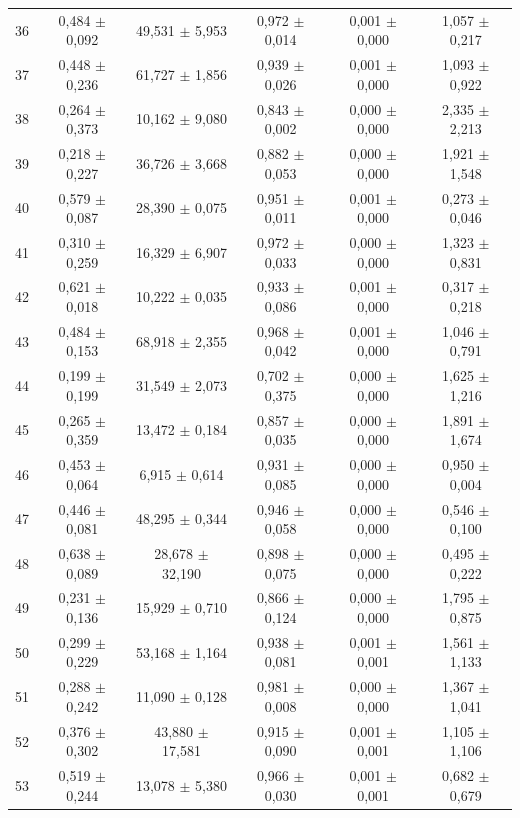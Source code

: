 \begin{tabular}{l c c c c c}
36 & 0,484 $\pm$ 0,092 & 49,531 $\pm$ 5,953 & 0,972 $\pm$ 0,014 & 0,001 $\pm$ 0,000 & 1,057 $\pm$ 0,217 \\
37 & 0,448 $\pm$ 0,236 & 61,727 $\pm$ 1,856 & 0,939 $\pm$ 0,026 & 0,001 $\pm$ 0,000 & 1,093 $\pm$ 0,922 \\
38 & 0,264 $\pm$ 0,373 & 10,162 $\pm$ 9,080 & 0,843 $\pm$ 0,002 & 0,000 $\pm$ 0,000 & 2,335 $\pm$ 2,213 \\
39 & 0,218 $\pm$ 0,227 & 36,726 $\pm$ 3,668 & 0,882 $\pm$ 0,053 & 0,000 $\pm$ 0,000 & 1,921 $\pm$ 1,548 \\
40 & 0,579 $\pm$ 0,087 & 28,390 $\pm$ 0,075 & 0,951 $\pm$ 0,011 & 0,001 $\pm$ 0,000 & 0,273 $\pm$ 0,046 \\
41 & 0,310 $\pm$ 0,259 & 16,329 $\pm$ 6,907 & 0,972 $\pm$ 0,033 & 0,000 $\pm$ 0,000 & 1,323 $\pm$ 0,831 \\
42 & 0,621 $\pm$ 0,018 & 10,222 $\pm$ 0,035 & 0,933 $\pm$ 0,086 & 0,001 $\pm$ 0,000 & 0,317 $\pm$ 0,218 \\
43 & 0,484 $\pm$ 0,153 & 68,918 $\pm$ 2,355 & 0,968 $\pm$ 0,042 & 0,001 $\pm$ 0,000 & 1,046 $\pm$ 0,791 \\
44 & 0,199 $\pm$ 0,199 & 31,549 $\pm$ 2,073 & 0,702 $\pm$ 0,375 & 0,000 $\pm$ 0,000 & 1,625 $\pm$ 1,216 \\
45 & 0,265 $\pm$ 0,359 & 13,472 $\pm$ 0,184 & 0,857 $\pm$ 0,035 & 0,000 $\pm$ 0,000 & 1,891 $\pm$ 1,674 \\
46 & 0,453 $\pm$ 0,064 & 6,915 $\pm$ 0,614 & 0,931 $\pm$ 0,085 & 0,000 $\pm$ 0,000 & 0,950 $\pm$ 0,004 \\
47 & 0,446 $\pm$ 0,081 & 48,295 $\pm$ 0,344 & 0,946 $\pm$ 0,058 & 0,000 $\pm$ 0,000 & 0,546 $\pm$ 0,100 \\
48 & 0,638 $\pm$ 0,089 & 28,678 $\pm$ 32,190 & 0,898 $\pm$ 0,075 & 0,000 $\pm$ 0,000 & 0,495 $\pm$ 0,222 \\
49 & 0,231 $\pm$ 0,136 & 15,929 $\pm$ 0,710 & 0,866 $\pm$ 0,124 & 0,000 $\pm$ 0,000 & 1,795 $\pm$ 0,875 \\
50 & 0,299 $\pm$ 0,229 & 53,168 $\pm$ 1,164 & 0,938 $\pm$ 0,081 & 0,001 $\pm$ 0,001 & 1,561 $\pm$ 1,133 \\
51 & 0,288 $\pm$ 0,242 & 11,090 $\pm$ 0,128 & 0,981 $\pm$ 0,008 & 0,000 $\pm$ 0,000 & 1,367 $\pm$ 1,041 \\
52 & 0,376 $\pm$ 0,302 & 43,880 $\pm$ 17,581 & 0,915 $\pm$ 0,090 & 0,001 $\pm$ 0,001 & 1,105 $\pm$ 1,106 \\
53 & 0,519 $\pm$ 0,244 & 13,078 $\pm$ 5,380 & 0,966 $\pm$ 0,030 & 0,001 $\pm$ 0,001 & 0,682 $\pm$ 0,679 \\

\end{tabular}

